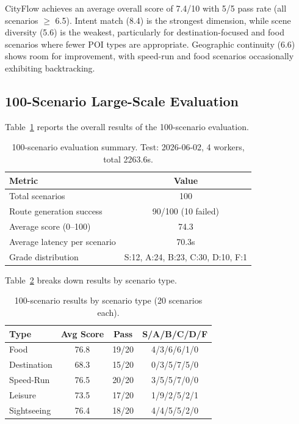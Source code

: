 CityFlow achieves an average overall score of 7.4/10 with 5/5 pass rate (all scenarios $\geq$ 6.5). Intent match (8.4) is the strongest dimension, while scene diversity (5.6) is the weakest, particularly for destination-focused and food scenarios where fewer POI types are appropriate. Geographic continuity (6.6) shows room for improvement, with speed-run and food scenarios occasionally exhibiting backtracking.

\subsection{100-Scenario Large-Scale Evaluation}

Table~\ref{tab:100_overview} reports the overall results of the 100-scenario evaluation.

\begin{table}[H]
\centering
\caption{100-scenario evaluation summary. Test: 2026-06-02, 4 workers, total 2263.6s.}
\label{tab:100_overview}
\begin{tabular}{@{}lc@{}}
\toprule
\textbf{Metric} & \textbf{Value} \\
\midrule
Total scenarios & 100 \\
Route generation success & 90/100 (10 failed) \\
Average score (0--100) & 74.3 \\
Average latency per scenario & 70.3s \\
\midrule
Grade distribution & S:12, A:24, B:23, C:30, D:10, F:1 \\
\bottomrule
\end{tabular}
\end{table}

Table~\ref{tab:100_by_type} breaks down results by scenario type.

\begin{table}[H]
\centering
\caption{100-scenario results by scenario type (20 scenarios each).}
\label{tab:100_by_type}
\begin{tabular}{@{}lccc@{}}
\toprule
\textbf{Type} & \textbf{Avg Score} & \textbf{Pass} & \textbf{S/A/B/C/D/F} \\
\midrule
Food & 76.8 & 19/20 & 4/3/6/6/1/0 \\
Destination & 68.3 & 15/20 & 0/3/5/7/5/0 \\
Speed-Run & 76.5 & 20/20 & 3/5/5/7/0/0 \\
Leisure & 73.5 & 17/20 & 1/9/2/5/2/1 \\
Sightseeing & 76.4 & 18/20 & 4/4/5/5/2/0 \\
\bottomrule
\end{tabular}
\end{table}

